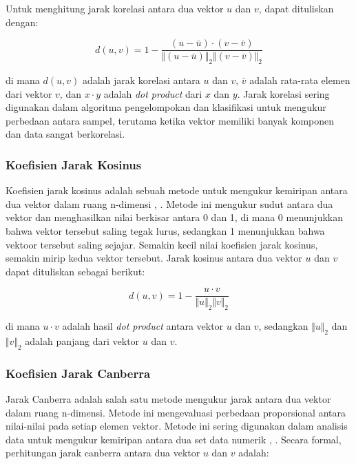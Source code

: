 Untuk menghitung jarak korelasi antara dua vektor $u$ dan $v$, dapat dituliskan dengan:

\begin{equation}
	d(u,v) = 1-\frac{(u-\bar{u})\cdot (v-\bar{v})}{\Vert(u-\bar{u})\Vert_2\Vert(v-\bar{v})\Vert_2}
\end{equation}

\noindent di mana $d(u, v)$ adalah jarak korelasi antara $u$ dan $v$, $\bar{v}$ adalah rata-rata elemen dari vektor $v$, dan $x\cdot y$ adalah \emph{dot product} dari $x$ dan $y$. Jarak korelasi sering digunakan dalam algoritma pengelompokan dan klasifikasi untuk mengukur perbedaan antara sampel, terutama ketika vektor memiliki banyak komponen dan data sangat berkorelasi.

\subsubsection{Koefisien Jarak Kosinus}
Koefisien jarak kosinus adalah sebuah metode untuk mengukur kemiripan antara dua vektor dalam ruang n-dimensi \cite{schutze2008introduction},
\cite{deisenroth2020mathematics}. Metode ini mengukur sudut antara dua vektor dan menghasilkan nilai berkisar antara 0 dan 1, di mana 0 menunjukkan bahwa
vektor tersebut saling tegak lurus, sedangkan 1 menunjukkan bahwa vektoor tersebut saling sejajar. Semakin kecil nilai koefisien jarak kosinus, semakin mirip
kedua vektor tersebut. Jarak kosinus antara dua vektor $u$ dan $v$ dapat dituliskan sebagai berikut:

\begin{equation}
	d(u,v) = 1-\frac{u\cdot v}{\Vert u\Vert_2\Vert v\Vert_2}
\end{equation}

\noindent di mana $u\cdot v$ adalah hasil \emph{dot product} antara vektor $u$ dan $v$, sedangkan $\Vert u\Vert_2$ dan $\Vert v\Vert_2$ adalah panjang dari vektor $u$ dan $v$.

\subsubsection{Koefisien Jarak Canberra}
Jarak Canberra adalah salah satu metode mengukur jarak antara dua vektor dalam ruang n-dimensi. Metode ini mengevaluasi perbedaan proporsional antara
nilai-nilai pada setiap elemen vektor. Metode ini sering digunakan dalam analisis data untuk mengukur kemiripan antara dua set data numerik
\cite{clusteringSumayiaAlAnazi}, \cite{sneath1973numerical}. Secara formal, perhitungan jarak canberra antara dua vektor $u$ dan $v$ adalah:

